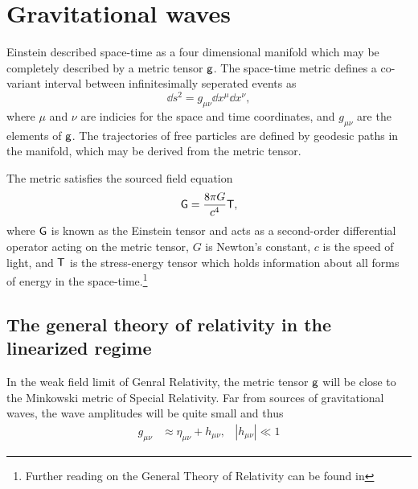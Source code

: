 \chapter{Gravitational waves}


Einstein described space-time as a four dimensional manifold which may be completely described by a metric tensor $\mathsf{g}$. %
The space-time metric defines a co-variant interval between infinitesimally seperated events as
\begin{equation}
\dd s^2 = g_{\mu \nu}\dd x^\mu \dd x^\nu,
\end{equation}
where $\mu$ and $\nu$ are indicies for the space and time coordinates, and $g_{\mu \nu}$ are the elements of $\mathsf{g}$. %
The trajectories of free particles are defined by geodesic paths in the manifold, which may be derived from the metric tensor.

The metric satisfies the sourced field equation
\begin{equation}
\label{eqn:einstein}
\mathsf{G}=\frac{8\pi G}{c^4}\mathsf{T},
\end{equation}
where $\mathsf{G}$ is known as the Einstein tensor and acts as a second-order differential operator acting on the metric tensor, $G$ is Newton's constant, $c$ is the speed of light, and $\mathsf{T}$ is the stress-energy tensor which holds information about all forms of energy in the space-time.\footnote{Further reading on the General Theory of Relativity can be found in }

\section{The general theory of relativity in the linearized regime}
In the weak field limit of Genral Relativity, the metric tensor $\mathsf{g}$ will be close to the Minkowski metric of Special Relativity. %
Far from sources of gravitational waves, the wave amplitudes will be quite small and thus
\begin{align}
g_{\mu \nu}&\approx \eta_{\mu \nu}+h_{\mu \nu}, &|h_{\mu \nu}|\ll 1
\end{align}

